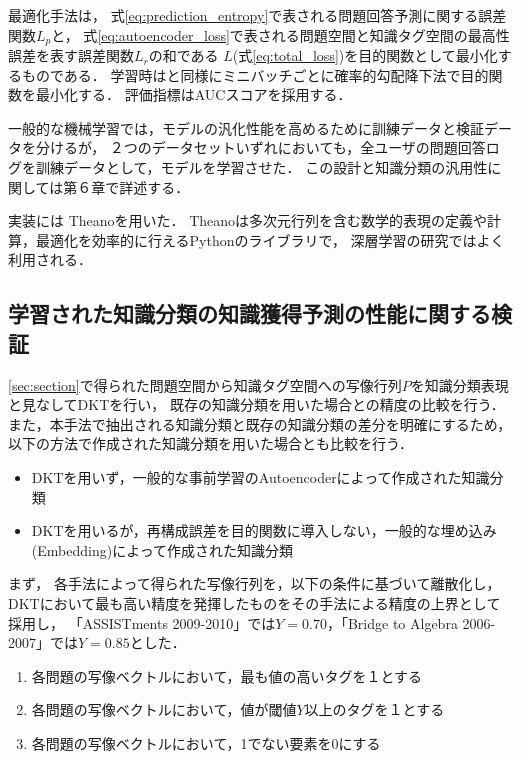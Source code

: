 最適化手法は，
式\ref{eq:prediction_entropy}で表される問題回答予測に関する誤差関数$L_p$と，
式\ref{eq:autoencoder_loss}で表される問題空間と知識タグ空間の最高性誤差を表す誤差関数$L_r$の和である
$L$(式\ref{eq:total_loss})を目的関数として最小化するものである．
学習時は\cite{piech2015deep}と同様にミニバッチごとに確率的勾配降下法で目的関数を最小化する．
評価指標はAUCスコアを採用する．

一般的な機械学習では，モデルの汎化性能を高めるために訓練データと検証データを分けるが，
２つのデータセットいずれにおいても，全ユーザの問題回答ログを訓練データとして，モデルを学習させた．
この設計と知識分類の汎用性に関しては第６章で詳述する．

実装には
Theanoを用いた\cite{bergstra+al:2010-scipy,Bastien-Theano-2012}．
Theanoは多次元行列を含む数学的表現の定義や計算，最適化を効率的に行えるPythonのライブラリで，
深層学習の研究ではよく利用される．


\subsection{学習された知識分類の知識獲得予測の性能に関する検証}

\ref{sec:section}で得られた問題空間から知識タグ空間への写像行列$P$を知識分類表現と見なしてDKTを行い，
既存の知識分類を用いた場合との精度の比較を行う．
また，本手法で抽出される知識分類と既存の知識分類の差分を明確にするため，
以下の方法で作成された知識分類を用いた場合とも比較を行う．
\begin{itemize}
\item DKTを用いず，一般的な事前学習のAutoencoderによって作成された知識分類 \label{c1}
\item DKTを用いるが，再構成誤差を目的関数に導入しない，一般的な埋め込み(Embedding)によって作成された知識分類 \label{c2}
\end{itemize}

まず，
各手法によって得られた写像行列を，以下の条件に基づいて離散化し，
DKTにおいて最も高い精度を発揮したものをその手法による精度の上界として採用し，
「ASSISTments 2009-2010」では$Y = 0.70$，「Bridge to Algebra 2006-2007」では$Y = 0.85$とした．
\begin{enumerate}
\item 各問題の写像ベクトルにおいて，最も値の高いタグを１とする
\item 各問題の写像ベクトルにおいて，値が閾値$Y$以上のタグを１とする
\item 各問題の写像ベクトルにおいて，1でない要素を0にする
\end{enumerate}


